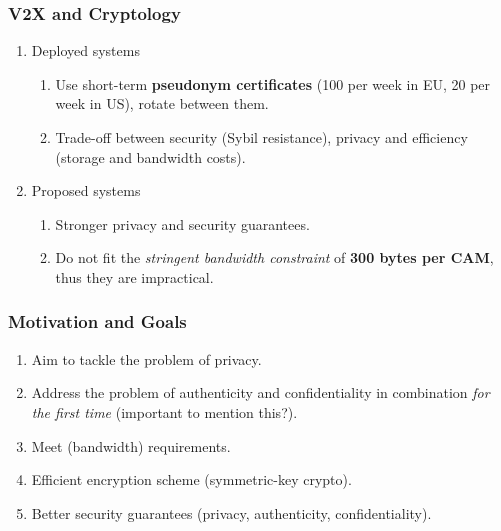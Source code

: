 \documentclass{beamer}
\begin{document}
    \begin{frame}
        \frametitle{V2X and Cryptology}
        \begin{enumerate}
            \item Deployed systems
            \begin{enumerate}
                \item Use short-term \textbf{pseudonym certificates} (100 per
                week in EU, 20 per week in US), rotate between them.
                \item Trade-off between security (Sybil resistance), privacy and
                efficiency (storage and bandwidth costs).
            \end{enumerate}
            \pause
            \item Proposed systems
            \begin{enumerate}
                \item Stronger privacy and security guarantees.
                \item Do not fit the \emph{stringent bandwidth constraint} of
                \textbf{300 bytes per CAM}, thus they are impractical.
            \end{enumerate}
        \end{enumerate}
    \end{frame}

    \begin{frame}
        \frametitle{Motivation and Goals}
        \begin{enumerate}
            \item Aim to tackle the problem of privacy.
            \item Address the problem of authenticity and confidentiality in
            combination \emph{for the first time} (important to mention this?).
            \item Meet (bandwidth) requirements.
            \item Efficient encryption scheme (symmetric-key crypto).
            \item Better security guarantees (privacy, authenticity,
            confidentiality).
        \end{enumerate}
    \end{frame}
\end{document}
